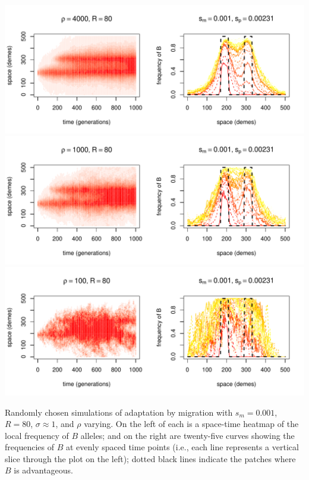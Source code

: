 \documentclass{article}
\begin{document}
\begin{sfigure}
  \begin{center}
    \includegraphics{example-migration-sims/88079-r1-501-sb0_01-sm-0_001-N4000-pophistory-run}
    \includegraphics{example-migration-sims/3464-r1-501-sb0_01-sm-0_001-N1000-pophistory-run}
    \includegraphics{example-migration-sims/37774-r1-501-sb0_01-sm-0_001-N100-pophistory-run}
  \end{center}
  \caption{
    Randomly chosen simulations of adaptation by migration
    with $s_m=0.001$, $R=80$, $\sigma\approx 1$, and $\rho$ varying.
    On the left of each is a space-time heatmap of the local frequency of $B$ alleles;
    and on the right are twenty-five curves showing the frequencies of $B$ at evenly spaced time points
    (i.e., each line represents a vertical slice through the plot on the left);
    dotted black lines indicate the patches where $B$ is advantageous.
  } \label{sfig:sims_7}
\end{sfigure}
\end{document}
